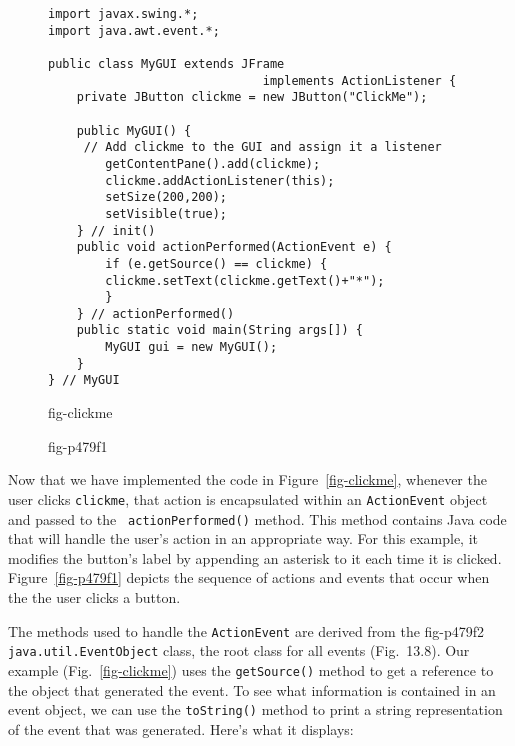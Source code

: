 \begin{figure}[h]
\jjjprogstart
\begin{jjjlisting}
\begin{lstlisting}
import javax.swing.*;
import java.awt.event.*;

public class MyGUI extends JFrame 
                              implements ActionListener {
    private JButton clickme = new JButton("ClickMe");

    public MyGUI() {
     // Add clickme to the GUI and assign it a listener
        getContentPane().add(clickme);   
        clickme.addActionListener(this);
        setSize(200,200);
        setVisible(true);
    } // init()
    public void actionPerformed(ActionEvent e) {
        if (e.getSource() == clickme) {
	    clickme.setText(clickme.getText()+"*");
        }
    } // actionPerformed()
    public static void main(String args[]) {
        MyGUI gui = new MyGUI();
    }
} // MyGUI
\end{lstlisting}
\end{jjjlisting}
{fig-clickme}
\end{figure}

\begin{figure}[tb]
 {fig-p479f1}

\end{figure}

Now that we have implemented the code in Figure~\ref{fig-clickme},
whenever the user clicks {\tt clickme}, that action is encapsulated
within an {\tt ActionEvent} object and passed to the {\tt
actionPerformed()} method.  This method contains Java code that will
handle the user's action in an appropriate way.  For this example, it
modifies the button's label by appending an asterisk to it each time
it is clicked.  Figure~\ref{fig-p479f1} depicts the
sequence of actions and events that occur when the the user 
clicks a button.

\pagebreak
The methods used to handle the {\tt ActionEvent} are derived from the
{fig-p479f2}
{\tt java.util.EventObject} class, the root class for all events
(Fig.~13.8).  Our example (Fig.~\ref{fig-clickme}) uses
the {\tt getSource()} method to get a reference to the object that
generated the event.  To see what information is contained in an
event object, we can use the {\tt toString()} method to print
a string representation of the event that was generated.  Here's what
it displays:

